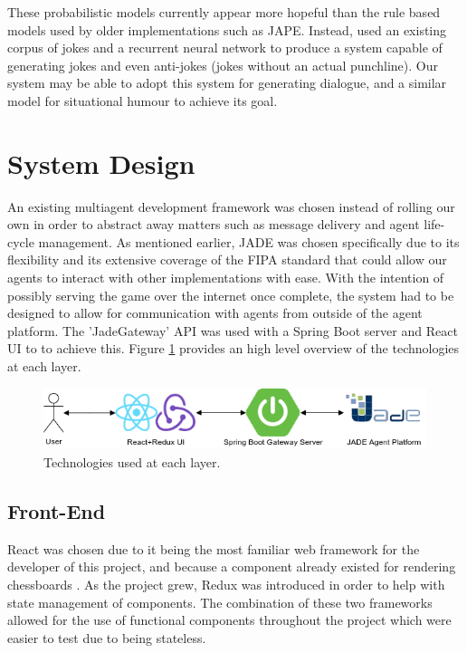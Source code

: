 \documentclass[conference]{IEEEtran}
\begin{document}
These probabilistic models currently appear more hopeful than the rule based models used by older implementations such as JAPE. Instead, \cite{humourrnn} used an existing corpus of jokes and a recurrent neural network to produce a system capable of generating jokes and even anti-jokes (jokes without an actual punchline). Our system may be able to adopt this system for generating dialogue, and a similar model for situational humour to achieve its goal.

\section{System Design}

An existing multiagent development framework was chosen instead of rolling our own in order to abstract away matters such as message delivery and agent life-cycle management. As mentioned earlier, JADE was chosen specifically due to its flexibility and its extensive coverage of the FIPA standard that could allow our agents to interact with other implementations with ease. 
With the intention of possibly serving the game over the internet once complete, the system had to be designed to allow for communication with agents from outside of the agent platform. The 'JadeGateway' API was used with a Spring Boot server and React UI to to achieve this. Figure \ref{fig:highlevelarchitecture} provides an high level overview of the technologies at each layer.

\begin{figure}[h]
	\centering
	\includegraphics[width=\linewidth]{images/highlevelarchitecture}
	\caption{Technologies used at each layer.}
	\label{fig:highlevelarchitecture}
\end{figure}

\subsection{Front-End}

React \cite{reactjs} was chosen due to it being the most familiar web framework for the developer of this project, and because a component already existed for rendering chessboards \cite{chessboardjsx}. As the project grew, Redux \cite{redux} was introduced in order to help with state management of components. 
The combination of these two frameworks allowed for the use of functional components throughout the project which were easier to test due to being stateless. 
\end{document}
